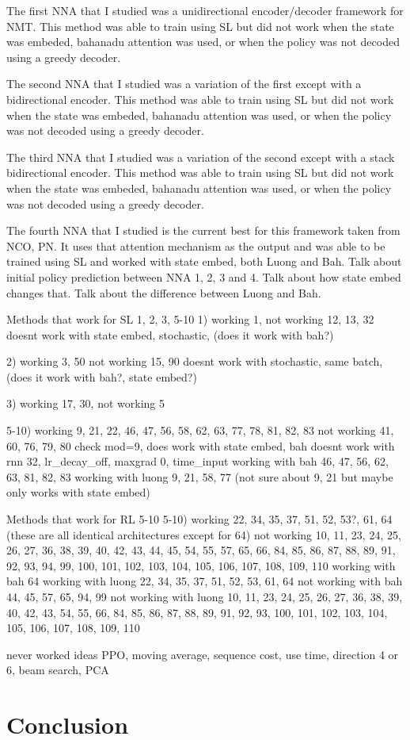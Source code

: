 \documentclass[12pt]{article}
\begin{document}
The first NNA that I studied was a unidirectional encoder/decoder framework for NMT. This method was able to train using SL but did not work when the state was embeded, bahanadu attention was used, or when the policy was not decoded using a greedy decoder.

The second NNA that I studied was a variation of the first except with a bidirectional encoder. This method was able to train using SL but did not work when the state was embeded, bahanadu attention was used, or when the policy was not decoded using a greedy decoder.

The third NNA that I studied was a variation of the second except with a stack bidirectional encoder. This method was able to train using SL but did not work when the state was embeded, bahanadu attention was used, or when the policy was not decoded using a greedy decoder.

The fourth NNA that I studied is the current best for this framework taken from NCO, PN. It uses that attention mechanism as the output and was able to be trained using SL and worked with state embed, both Luong and Bah. Talk about initial policy prediction between NNA 1, 2, 3 and 4. Talk about how state embed changes that. Talk about the difference between Luong and Bah.

Methods that work for SL 1, 2, 3, 5-10
1)
working 1,
not working 12, 13, 32
doesnt work with state embed, stochastic, (does it work with bah?)

2)
working 3, 50
not working 15, 90
doesnt work with stochastic, same batch, (does it work with bah?, state embed?)

3)
working 17, 30,
not working 5

5-10)
working 9, 21, 22, 46, 47, 56, 58, 62, 63, 77, 78, 81, 82, 83
not working 41, 60, 76, 79, 80
check mod=9, does work with state embed, bah
doesnt work with rnn 32, lr_decay_off, maxgrad 0, time_input
working with bah 46, 47, 56, 62, 63, 81, 82, 83
working with luong 9, 21, 58, 77 (not sure about 9, 21 but maybe only works with state embed)

Methods that work for RL 5-10
5-10)
working 22, 34, 35, 37, 51, 52, 53?, 61, 64 (these are all identical architectures except for 64)
not working 10, 11, 23, 24, 25, 26, 27, 36, 38, 39, 40, 42, 43, 44, 45, 54, 55, 57, 65, 66, 84, 85, 86, 87, 88, 89, 91, 92, 93, 94, 99, 100, 101, 102, 103, 104, 105, 106, 107, 108, 109, 110
working with bah 64
working with luong 22, 34, 35, 37, 51, 52, 53, 61, 64
not working with bah 44, 45, 57, 65, 94, 99
not working with luong 10, 11, 23, 24, 25, 26, 27, 36, 38, 39, 40, 42, 43, 54, 55, 66, 84, 85, 86, 87, 88, 89, 91, 92, 93, 100, 101, 102, 103, 104, 105, 106, 107, 108, 109, 110

never worked ideas PPO, moving average, sequence cost, use time, direction 4 or 6, beam search, PCA

\section{Conclusion}


\citet{2016_Mnih}



\end{document}
